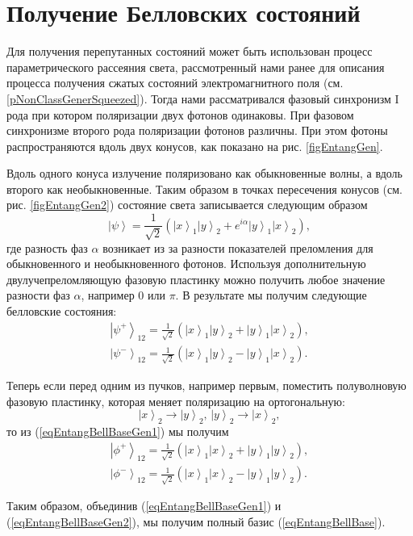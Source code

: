 \section{Получение Белловских состояний}
\label{subsecPart3NonclassEntanglBelGener}

Для получения перепутанных состояний может быть использован процесс
параметрического рассеяния света, рассмотренный нами ранее для
описания процесса получения сжатых состояний электромагнитного
поля (см. \ref{pNonClassGenerSqueezed}). Тогда нами рассматривался
фазовый синхронизм I рода при котором поляризации двух фотонов
одинаковы. При фазовом синхронизме второго рода поляризации фотонов
различны. При этом фотоны распространяются вдоль двух конусов, как
показано на рис. \ref{figEntangGen}. 



Вдоль одного конуса излучение поляризовано
как обыкновенные волны, а вдоль второго как необыкновенные. Таким
образом в точках пересечения конусов (см. рис. \ref{figEntangGen2})
состояние света записывается следующим образом
\begin{equation}
\left|\psi\right> =
  \frac{1}{\sqrt{2}}\left(
  \left|x\right>_1\left|y\right>_2 + e^{i \alpha}
  \left|y\right>_1\left|x\right>_2
  \right),
\nonumber
\end{equation}
где разность фаз $\alpha$ возникает из за разности показателей
преломления для обыкновенного и необыкновенного фотонов. Используя
дополнительную двулучепреломляющую фазовую пластинку можно получить
любое значение разности фаз
$\alpha$, например $0$ или $\pi$. В результате мы получим следующие белловские состояния:
\begin{eqnarray}
  \left|\psi^{+}\right>_{12} = 
  \frac{1}{\sqrt{2}}\left(
  \left|x\right>_1\left|y\right>_2 + 
  \left|y\right>_1\left|x\right>_2
  \right),
  \nonumber \\
  \left|\psi^{-}\right>_{12} = 
  \frac{1}{\sqrt{2}}\left(
  \left|x\right>_1\left|y\right>_2 - 
  \left|y\right>_1\left|x\right>_2
  \right).
  \label{eqEntangBellBaseGen1}
\end{eqnarray}



Теперь если перед одним из пучков, например первым, поместить полуволновую фазовую
пластинку, которая меняет поляризацию на ортогональную:
\begin{equation}
\left|x\right>_2 \rightarrow \left|y\right>_2, \, \left|y\right>_2 \rightarrow \left|x\right>_2,
\nonumber
\end{equation}
то из (\ref{eqEntangBellBaseGen1}) мы получим
\begin{eqnarray}
  \left|\phi^{+}\right>_{12} = 
  \frac{1}{\sqrt{2}}\left(
  \left|x\right>_1\left|x\right>_2 + 
  \left|y\right>_1\left|y\right>_2
  \right),
  \nonumber \\
  \left|\phi^{-}\right>_{12} = 
  \frac{1}{\sqrt{2}}\left(
  \left|x\right>_1\left|x\right>_2 - 
  \left|y\right>_1\left|y\right>_2
  \right).
  \label{eqEntangBellBaseGen2}
\end{eqnarray}

Таким образом, объединив (\ref{eqEntangBellBaseGen1}) и
(\ref{eqEntangBellBaseGen2}), мы получим полный базис (\ref{eqEntangBellBase}).



